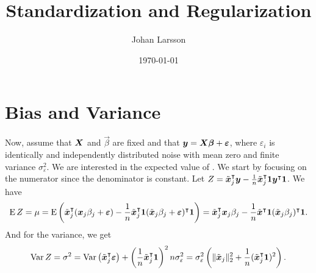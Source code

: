 


\newcommand{\mv}[1]{{\boldsymbol{\mathrm{#1}}}}

\title{Standardization and Regularization}
\author[1,*]{Johan Larsson}
\date{\today}

\usepackage[style=alphabetic]{biblatex}




\maketitle




\section{Bias and Variance}

Now, assume that \(\boldsymbol{X}\) and \(\vec{\beta}\) are fixed and that \(\boldsymbol{y} = \boldsymbol{X}\boldsymbol{\beta} + \boldsymbol{\varepsilon}\), where \(\varepsilon_i\) is identically and independently distributed noise with mean zero and finite variance \(\sigma_\varepsilon^2\). We are interested in the expected value of . We start by focusing on the numerator since the denominator is constant. Let \(Z = \tilde{\boldsymbol{x}}_j^\intercal \boldsymbol{y} - \frac{1}{n} \tilde{\boldsymbol{x}}_j^\intercal \boldsymbol{1} \boldsymbol{y}^\intercal \boldsymbol{1}\). We have
\[
  \operatorname{E} Z = \mu = \operatorname{E} \left( \tilde{\boldsymbol{x}}_j^\intercal (\boldsymbol{x}_j\beta_j + \boldsymbol{\varepsilon}) - \frac{1}{n} \tilde{\boldsymbol{x}}_j^\intercal \boldsymbol{1} (\tilde{\boldsymbol{x}}_j\beta_j + \boldsymbol{\varepsilon})^\intercal \boldsymbol{1} \right)  = \tilde{\boldsymbol{x}}_j^\intercal\boldsymbol{x}_j \beta_j - \frac{1}{n} \tilde{\boldsymbol{x}}^\intercal \boldsymbol{1} (\tilde{\boldsymbol{x}}_j\beta_j)^\intercal\boldsymbol{1}.
\]
And for the variance, we get
\[
  \operatorname{Var} Z = \sigma^2 = \operatorname{Var}\left(\tilde{\boldsymbol{x}}_j ^\intercal \boldsymbol{\varepsilon}\right) + \left(\frac{1}{n}\tilde{\boldsymbol{x}}_j^\intercal \boldsymbol{1}\right)^2 n \sigma_\varepsilon^2
  = \sigma_\varepsilon^2\left( \lVert \tilde{\boldsymbol{x}}_j\rVert_2^2 +\frac{1}{n}(\tilde{\boldsymbol{x}}_j^\intercal \boldsymbol{1})^2\right).
\]

